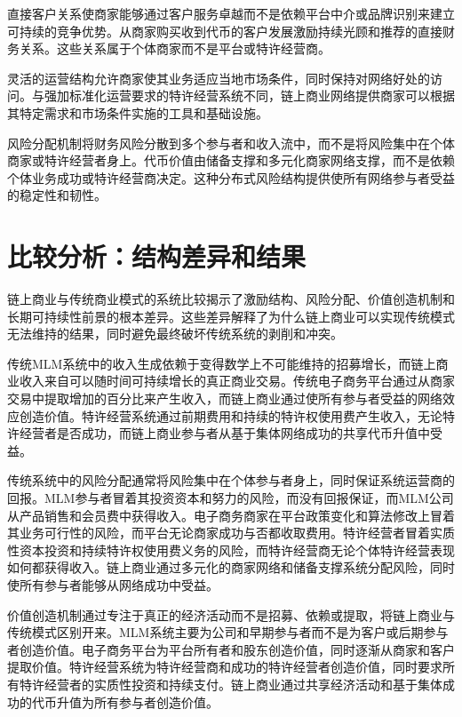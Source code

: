 \documentclass[
  Letterpaper,
]{scrbook}
\begin{document}
直接客户关系使商家能够通过客户服务卓越而不是依赖平台中介或品牌识别来建立可持续的竞争优势。从商家购买收到代币的客户发展激励持续光顾和推荐的直接财务关系。这些关系属于个体商家而不是平台或特许经营商。

灵活的运营结构允许商家使其业务适应当地市场条件，同时保持对网络好处的访问。与强加标准化运营要求的特许经营系统不同，链上商业网络提供商家可以根据其特定需求和市场条件实施的工具和基础设施。

风险分配机制将财务风险分散到多个参与者和收入流中，而不是将风险集中在个体商家或特许经营者身上。代币价值由储备支撑和多元化商家网络支撑，而不是依赖个体业务成功或特许经营商决定。这种分布式风险结构提供使所有网络参与者受益的稳定性和韧性。

\section{比较分析：结构差异和结果}\label{ux6bd4ux8f83ux5206ux6790ux7ed3ux6784ux5deeux5f02ux548cux7ed3ux679c}

链上商业与传统商业模式的系统比较揭示了激励结构、风险分配、价值创造机制和长期可持续性前景的根本差异。这些差异解释了为什么链上商业可以实现传统模式无法维持的结果，同时避免最终破坏传统系统的剥削和冲突。

传统MLM系统中的收入生成依赖于变得数学上不可能维持的招募增长，而链上商业收入来自可以随时间可持续增长的真正商业交易。传统电子商务平台通过从商家交易中提取增加的百分比来产生收入，而链上商业通过使所有参与者受益的网络效应创造价值。特许经营系统通过前期费用和持续的特许权使用费产生收入，无论特许经营者是否成功，而链上商业参与者从基于集体网络成功的共享代币升值中受益。

传统系统中的风险分配通常将风险集中在个体参与者身上，同时保证系统运营商的回报。MLM参与者冒着其投资资本和努力的风险，而没有回报保证，而MLM公司从产品销售和会员费中获得收入。电子商务商家在平台政策变化和算法修改上冒着其业务可行性的风险，而平台无论商家成功与否都收取费用。特许经营者冒着实质性资本投资和持续特许权使用费义务的风险，而特许经营商无论个体特许经营表现如何都获得收入。链上商业通过多元化的商家网络和储备支撑系统分配风险，同时使所有参与者能够从网络成功中受益。

价值创造机制通过专注于真正的经济活动而不是招募、依赖或提取，将链上商业与传统模式区别开来。MLM系统主要为公司和早期参与者而不是为客户或后期参与者创造价值。电子商务平台为平台所有者和股东创造价值，同时逐渐从商家和客户提取价值。特许经营系统为特许经营商和成功的特许经营者创造价值，同时要求所有特许经营者的实质性投资和持续支付。链上商业通过共享经济活动和基于集体成功的代币升值为所有参与者创造价值。
\end{document}
